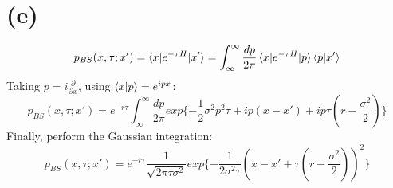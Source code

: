 \documentclass[12pt,a4paper]{paper}
\begin{document}
\section{(e)}
\begin{equation}
p_{BS}(x, \tau; x') = \braket{x|e^{-\tau H}|x'} = \int_{\infty}^{\infty} \frac{dp}{2\pi}\braket{x|e^{-\tau H}|p}\braket{p|x'}
\end{equation}
Taking $p = i \frac{\partial}{\partial x}$, using $\braket{x|p} = e^{ipx}$:
\begin{equation}
p_{BS}(x, \tau;x') = e^{-r\tau}\int_{\infty}^{\infty}\frac{dp}{2\pi}exp\{- \frac{1}{2}\sigma^2p^2\tau + ip(x - x') + ip\tau(r - \frac{\sigma^2}{2}) \}
\end{equation}
Finally, perform the Gaussian integration:
\begin{equation}
p_{BS}(x, \tau;x') = e^{-r\tau} \frac{1}{\sqrt{2\pi \tau \sigma^2}} exp\{ - \frac{1}{2 \sigma^2 \tau}(x - x' + \tau(r - \frac{\sigma^2}{2}) )^2 \}
\end{equation}
\end{document}
